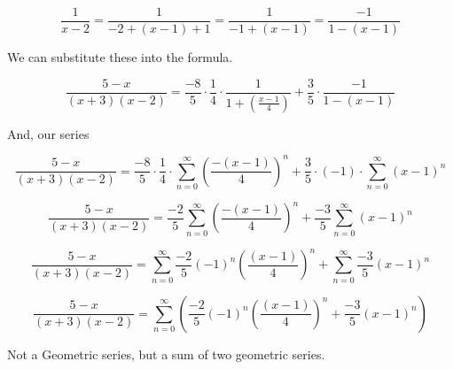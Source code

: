 \documentclass{ximera}
\begin{document}
\[    \frac{1}{x-2} =  \frac{1}{-2 + (x-1)+1}    =  \frac{1}{-1 + (x-1)}   =  \frac{-1}{1 - (x-1)}  \]



We can substitute these into the formula.






\[ \frac{5-x}{(x+3)(x-2)}     =  \frac{-8}{5} \cdot \frac{1}{4} \cdot \frac{1}{1+\left( \frac{x-1}{4} \right) } + \frac{3}{5} \cdot \frac{-1}{1 - (x-1)}      \]



And, our series



\[ \frac{5-x}{(x+3)(x-2)}     =  \frac{-8}{5} \cdot \frac{1}{4} \cdot     \sum_{n=0}^{\infty} \left( \frac{-(x-1)}{4} \right)^n                 + \frac{3}{5} \cdot (-1) \cdot \sum_{n=0}^{\infty} (x-1)^n     \]






\[ \frac{5-x}{(x+3)(x-2)}     =  \frac{-2}{5}     \sum_{n=0}^{\infty} \left( \frac{-(x-1)}{4} \right)^n                 + \frac{-3}{5} \sum_{n=0}^{\infty} (x-1)^n     \]












\[ \frac{5-x}{(x+3)(x-2)}     =      \sum_{n=0}^{\infty} \frac{-2}{5}  (-1)^n \left( \frac{(x-1)}{4} \right)^n                 +  \sum_{n=0}^{\infty} \frac{-3}{5} (x-1)^n     \]







\[ \frac{5-x}{(x+3)(x-2)}     =      \sum_{n=0}^{\infty} \left( \frac{-2}{5}  (-1)^n \left( \frac{(x-1)}{4} \right)^n                 +  \frac{-3}{5} (x-1)^n  \right)   \]










Not a Geometric series, but a sum of two geometric series.





\begin{center}
\end{center}
\end{document}
